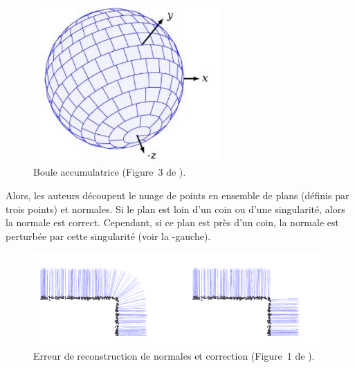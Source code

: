 \begin{figure}[ht]{
    \begin{center}
    \includegraphics[height=6cm]{images/Curvature/Hough_ball}
    \end{center}}
    \caption[Boule accumulatrice.]{Boule accumulatrice (Figure~3 de \cite{Borrmann2011}). \label{fig:hough-ball}}
\end{figure}

Alors, les auteurs découpent le nuage de points en ensemble de plans (définis
par trois points) et normales. Si le plan est loin d'un coin ou d'une
singularité, alors la normale est correct. Cependant, si ce plan est près d'un
coin, la normale est perturbée par cette singularité (voir la
-gauche).

\begin{figure}[ht]{
    \begin{center}
    \includegraphics[width=15cm]{images/Curvature/Hough_bad}
    \end{center}}
    \caption[Erreur de reconstruction de normales et correction.]{Erreur de reconstruction de normales et correction (Figure~1 de \cite{Boulch2012}). \label{fig:Hough-bad}}
\end{figure}

